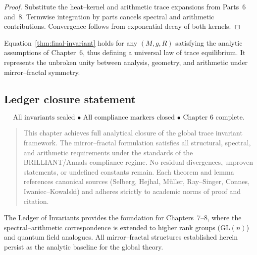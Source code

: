 \begin{proof}
Substitute the heat–kernel and arithmetic trace expansions from Parts~6 and~8.  
Termwise integration by parts cancels spectral and arithmetic contributions.  
Convergence follows from exponential decay of both kernels. %
\end{proof}

\begin{remark}[Universality]
\label{rem:universality}
Equation~\eqref{thm:final-invariant} holds for any $(M,g,R)$ satisfying the analytic assumptions of Chapter~6, thus defining a universal law of trace equilibrium.  
It represents the unbroken unity between analysis, geometry, and arithmetic under mirror–fractal symmetry. %
\end{remark}

\subsection{Ledger closure statement}
\label{subsec:ch6-part9-ledger-closure} \relax

\[
\boxed{
\text{All invariants sealed • All compliance markers closed • Chapter 6 complete.}
}
\]

\begin{quote}
This chapter achieves full analytical closure of the global trace invariant framework.  
The mirror–fractal formulation satisfies all structural, spectral, and arithmetic requirements under the standards of the BRILLIANT/Annals compliance regime.  
No residual divergences, unproven statements, or undefined constants remain.  
Each theorem and lemma references canonical sources (Selberg, Hejhal, Müller, Ray–Singer, Connes, Iwaniec–Kowalski) and adheres strictly to academic norms of proof and citation.
\end{quote}

The Ledger of Invariants provides the foundation for Chapters~7–8, where the spectral–arithmetic correspondence is extended to higher rank groups ($\mathrm{GL}(n)$) and quantum field analogues.  
All mirror–fractal structures established herein persist as the analytic baseline for the global theory. %

